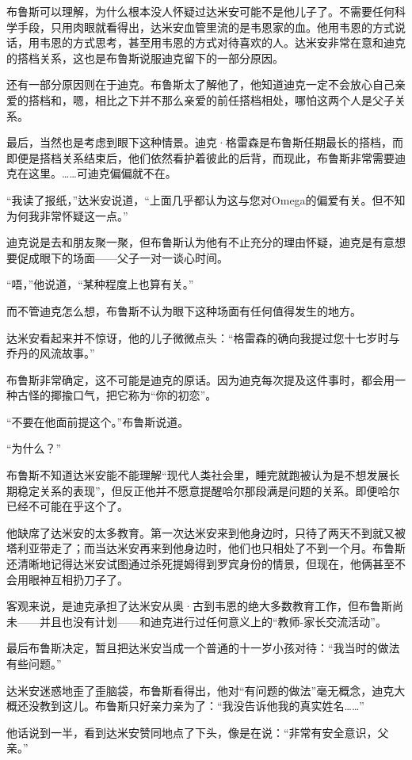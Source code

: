 \documentclass[../main]{subfiles}
\begin{document}
布鲁斯可以理解，为什么根本没人怀疑过达米安可能不是他儿子了。不需要任何科学手段，只用肉眼就看得出，达米安血管里流的是韦恩家的血。他用韦恩的方式说话，用韦恩的方式思考，甚至用韦恩的方式对待喜欢的人。达米安非常在意和迪克的搭档关系，这也是布鲁斯说服迪克留下的一部分原因。

还有一部分原因则在于迪克。布鲁斯太了解他了，他知道迪克一定不会放心自己亲爱的搭档和，嗯，相比之下并不那么亲爱的前任搭档相处，哪怕这两个人是父子关系。

最后，当然也是考虑到眼下这种情景。迪克·格雷森是布鲁斯任期最长的搭档，而即便是搭档关系结束后，他们依然看护着彼此的后背，而现此，布鲁斯非常需要迪克在这里。……可迪克偏偏就不在。

“我读了报纸，”达米安说道，“上面几乎都认为这与您对Omega的偏爱有关。但不知为何我非常怀疑这一点。”

迪克说是去和朋友聚一聚，但布鲁斯认为他有不止充分的理由怀疑，迪克是有意想要促成眼下的场面——父子一对一谈心时间。

“唔，”他说道，“某种程度上也算有关。”

而不管迪克怎么想，布鲁斯不认为眼下这种场面有任何值得发生的地方。

达米安看起来并不惊讶，他的儿子微微点头：“格雷森的确向我提过您十七岁时与乔丹的风流故事。”

布鲁斯非常确定，这不可能是迪克的原话。因为迪克每次提及这件事时，都会用一种古怪的揶揄口气，把它称为“你的初恋”。

“不要在他面前提这个。”布鲁斯说道。

“为什么？”

布鲁斯不知道达米安能不能理解“现代人类社会里，睡完就跑被认为是不想发展长期稳定关系的表现”，但反正他并不愿意提醒哈尔那段满是问题的关系。即便哈尔已经不可能在乎这个了。

他缺席了达米安的太多教育。第一次达米安来到他身边时，只待了两天不到就又被塔利亚带走了；而当达米安再来到他身边时，他们也只相处了不到一个月。布鲁斯还清晰地记得达米安试图通过杀死提姆得到罗宾身份的情景，但现在，他俩甚至不会用眼神互相扔刀子了。

客观来说，是迪克承担了达米安从奥·古到韦恩的绝大多数教育工作，但布鲁斯尚未——并且也没有计划——和迪克进行过任何意义上的“教师-家长交流活动”。

最后布鲁斯决定，暂且把达米安当成一个普通的十一岁小孩对待：“我当时的做法有些问题。”

达米安迷惑地歪了歪脑袋，布鲁斯看得出，他对“有问题的做法”毫无概念，迪克大概还没教到这儿。布鲁斯只好亲力亲为了：“我没告诉他我的真实姓名\ldots\ldots”

他话说到一半，看到达米安赞同地点了下头，像是在说：“非常有安全意识，父亲。”
\end{document}
